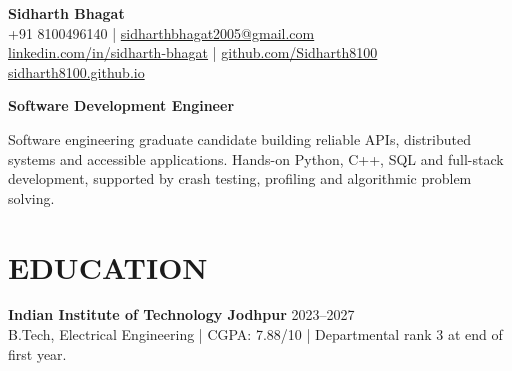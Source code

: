 \documentclass[10pt,a4paper]{article}
\begin{document}
\fontsize{9}{12.2}\selectfont
\begin{center}
{\fontsize{23}{26}\selectfont\bfseries Sidharth Bhagat}\\[4pt]
+91 8100496140 | \href{mailto:sidharthbhagat2005@gmail.com}{sidharthbhagat2005@gmail.com}\\
\href{https://www.linkedin.com/in/sidharth-bhagat/}{linkedin.com/in/sidharth-bhagat} | \href{https://github.com/Sidharth8100}{github.com/Sidharth8100}\\
\href{https://sidharth8100.github.io}{sidharth8100.github.io}
\end{center}
\textbf{Software Development Engineer}\par
Software engineering graduate candidate building reliable APIs, distributed systems and accessible applications. Hands-on Python, C++, SQL and full-stack development, supported by crash testing, profiling and algorithmic problem solving.
\section*{EDUCATION}
\textbf{Indian Institute of Technology Jodhpur} \hfill 2023--2027\\
B.Tech, Electrical Engineering | CGPA: 7.88/10 | Departmental rank 3 at end of first year.
\end{document}
